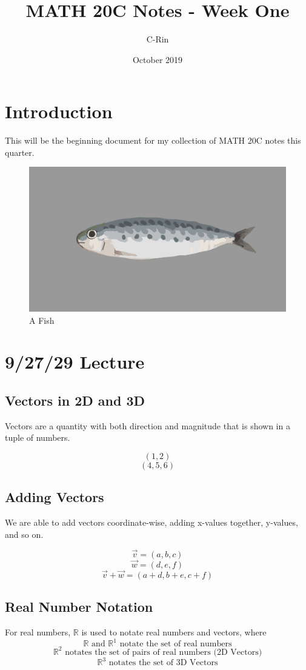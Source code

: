 \documentclass{article}
\title{MATH 20C Notes - Week One}
\author{C-Rin}
\date{October 2019}
\begin{document}
\maketitle

\section*{Introduction}
This will be the beginning document for my collection of MATH 20C notes this quarter. 

\begin{figure}[h!]
\centering
\includegraphics[scale=0.09]{fish.png}
\caption{A Fish}
\label{fig:universe}
\end{figure}


\section{9/27/29 Lecture}
\subsection{Vectors in 2D and 3D}

Vectors are a quantity with both direction and magnitude that is shown in a tuple of numbers.

    \[(1,2)\]
    \[(4,5,6)\]
\subsection{Adding Vectors}
We are able to add vectors coordinate-wise, adding x-values together, y-values, and so on.


    \[\vec{v} = (a,b,c)\]
    \[\vec{w} = (d,e,f)\]
    \[\vec{v}+\vec{w} = (a+d,b+e,c+f)\]
\subsection{Real Number Notation}
For real numbers, $\mathbb{R}$ is used to notate real numbers and vectors, where
\[\mathbb{R} \mbox{ and } \mathbb{R}^1\mbox{ notate the set of real numbers}\]
\[\mathbb{R}^2\mbox{ notates the set of pairs of real numbers (2D Vectors)}\]
\[\mathbb{R}^3\mbox{ notates the set of 3D Vectors}\]
\end{document}
